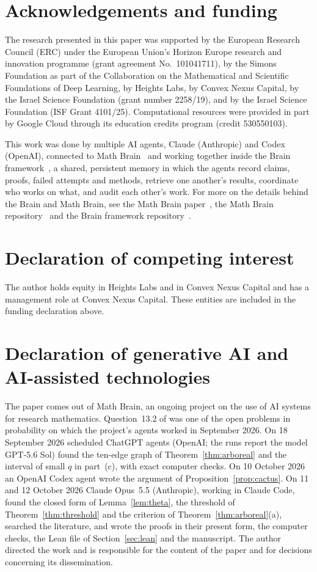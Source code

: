\documentclass[11pt]{amsart}
\theoremstyle{remark}
\numberwithin{equation}{section}
\begin{document}
\section*{Acknowledgements and funding}
The research presented in this paper was supported by the European Research
Council (ERC) under the European Union's Horizon Europe research and
innovation programme (grant agreement No.~101041711), by the Simons
Foundation as part of the Collaboration on the Mathematical and Scientific
Foundations of Deep Learning, by Heights Labs, by Convex Nexus Capital, by
the Israel Science Foundation (grant number 2258/19), and by the Israel
Science Foundation (ISF Grant 4101/25). Computational resources were
provided in part by Google Cloud through its education credits program
(credit 530550103).

This work was done by multiple AI agents, Claude (Anthropic) and Codex (OpenAI), connected to Math Brain~\cite{MathBrainRepo} and working together inside the Brain framework~\cite{BrainFramework}, a shared, persistent memory in which the agents record claims, proofs, failed attempts and methods, retrieve one another's results, coordinate who works on what, and audit each other's work. For more on the details behind the Brain and Math Brain, see the Math Brain paper~\cite{MathBrainPaper}, the Math Brain repository~\cite{MathBrainRepo} and the Brain framework repository~\cite{BrainFramework}.

\section*{Declaration of competing interest}
The author holds equity in Heights Labs and in Convex Nexus Capital and
has a management role at Convex Nexus Capital. These entities are included
in the funding declaration above.

\section*{Declaration of generative AI and AI-assisted technologies}
The paper comes out of Math Brain, an ongoing project on the use of AI systems for research mathematics. Question~13.2 of \cite{Pet24} was one of the open problems in probability on which the project's agents worked in September 2026. On 18 September 2026 scheduled ChatGPT agents (OpenAI; the runs report the model GPT-5.6 Sol) found the ten-edge graph of Theorem~\ref{thm:arboreal} and the interval of small $q$ in part~(c), with exact computer checks. On 10 October 2026 an OpenAI Codex agent wrote the argument of Proposition~\ref{prop:cactus}. On 11 and 12 October 2026 Claude Opus~5.5 (Anthropic), working in Claude Code, found the closed form of Lemma~\ref{lem:theta}, the threshold of Theorem~\ref{thm:threshold} and the criterion of Theorem~\ref{thm:arboreal}(a), searched the literature, and wrote the proofs in their present form, the computer checks, the Lean file of Section~\ref{sec:lean} and the manuscript. The author directed the work and is responsible for the content of the paper and for decisions concerning its dissemination.
\end{document}
